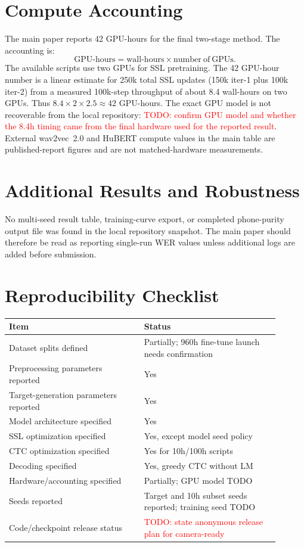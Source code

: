 \documentclass{article}
\newcommand{\todo}[1]{\textcolor{red}{TODO: #1}}
\begin{document}
\section{Compute Accounting}
The main paper reports 42 GPU-hours for the final two-stage method. The
accounting is:
\[
  \mathrm{GPU\mbox{-}hours} =
  \mathrm{wall\mbox{-}hours} \times \mathrm{number\ of\ GPUs}.
\]
The available scripts use two GPUs for SSL pretraining. The 42 GPU-hour
number is a linear estimate for 250k total SSL updates (150k iter-1 plus
100k iter-2) from a measured 100k-step throughput of about 8.4 wall-hours
on two GPUs. Thus $8.4 \times 2 \times 2.5 \approx 42$ GPU-hours.
The exact GPU model is not recoverable from the local repository:
\todo{confirm GPU model and whether the 8.4h timing came from the final
hardware used for the reported result}. External wav2vec~2.0 and HuBERT
compute values in the main table are published-report figures and are not
matched-hardware measurements.

\section{Additional Results and Robustness}
No multi-seed result table, training-curve export, or completed
phone-purity output file was found in the local repository snapshot. The
main paper should therefore be read as reporting single-run WER values
unless additional logs are added before submission.

\section{Reproducibility Checklist}
\begin{tabular}{@{}p{0.45\linewidth}p{0.45\linewidth}@{}}
\toprule
Item & Status \\
\midrule
Dataset splits defined & Partially; 960h fine-tune launch needs confirmation \\
Preprocessing parameters reported & Yes \\
Target-generation parameters reported & Yes \\
Model architecture specified & Yes \\
SSL optimization specified & Yes, except model seed policy \\
CTC optimization specified & Yes for 10h/100h scripts \\
Decoding specified & Yes, greedy CTC without LM \\
Hardware/accounting specified & Partially; GPU model TODO \\
Seeds reported & Target and 10h subset seeds reported; training seed TODO \\
Code/checkpoint release status & \todo{state anonymous release plan for camera-ready} \\
\bottomrule
\end{tabular}
\end{document}
